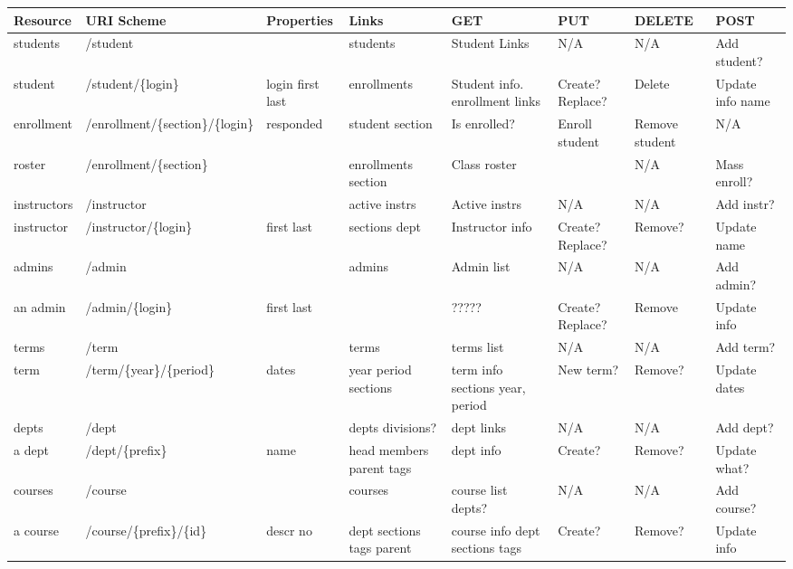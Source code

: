 \documentclass[10pt]{article}
\begin{document}
\begin{landscape}
\begin{longtable}[]{llp{1.5cm}p{2cm}p{2.5cm}llp{2.5cm}}
\toprule
Resource & URI Scheme & Properties & Links & GET & PUT & DELETE & POST\tabularnewline
\hline
\midrule
\endhead

students & /student &  & students & Student Links & N/A & N/A & Add student?\tabularnewline
\hline

student & /student/\{login\} & login first last & enrollments & Student info. enrollment links & Create? Replace? & Delete & Update info name\tabularnewline
\hline

enrollment & /enrollment/\{section\}/\{login\} & responded & student section & Is enrolled? & Enroll student & Remove student & N/A\tabularnewline
\hline

roster & /enrollment/\{section\} &  & enrollments section & Class roster &  & N/A & Mass enroll?\tabularnewline
\hline

instructors & /instructor &  & active instrs & Active instrs & N/A & N/A & Add instr?\tabularnewline
\hline

instructor & /instructor/\{login\} & first last & sections dept & Instructor info & Create? Replace? & Remove? & Update name\tabularnewline
\hline

admins & /admin &  & admins & Admin list & N/A & N/A & Add admin?\tabularnewline
\hline

an admin & /admin/\{login\} & first last &  & ????? & Create? Replace? & Remove & Update info\tabularnewline
\hline

terms & /term &  & terms & terms list & N/A & N/A & Add term?\tabularnewline
\hline

term & /term/\{year\}/\{period\} & dates & year period sections & term info sections year, period & New term? & Remove? & Update dates\tabularnewline
\hline

depts & /dept &  & depts divisions? & dept links & N/A & N/A & Add dept?\tabularnewline
\hline

a dept & /dept/\{prefix\} & name & head members parent tags & dept info & Create? & Remove? & Update what?\tabularnewline
\hline

courses & /course &  & courses & course list depts? & N/A & N/A & Add course?\tabularnewline
\hline

a course & /course/\{prefix\}/\{id\} & descr no & dept sections tags parent & course info dept sections tags & Create? & Remove? & Update info\tabularnewline
\hline


\end{longtable}
\end{landscape}
\end{document}
